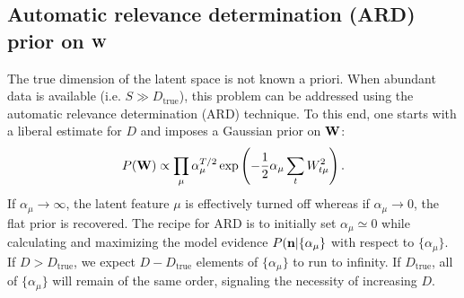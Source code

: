\documentclass[nofootinbib,amssymb,amsmath]{revtex4}
\newcommand{\vn}{{\bf n}}
\newcommand{\vW}{{\bf W}}
\begin{document}
\subsection{Automatic relevance determination (ARD) prior on $\vW$}
The true dimension of the latent space is not known a priori. When abundant data is available (i.e. $S \gg D_\mathrm{true}$), this problem can be addressed using the automatic relevance determination (ARD) technique. To this end, one starts with a liberal estimate for $D$ and imposes a Gaussian prior on $\vW$:
\begin{equation}
P(\vW) \propto \prod_\mu \alpha_\mu^{T/2} \exp \left( -\frac{1}{2} \alpha_\mu \sum_t W_{t\mu}^2  \right).
\label{eq:ARD_prior}
\end{equation}
If $\alpha_\mu \rightarrow \infty$, the latent feature $\mu$ is effectively turned off whereas if $\alpha_\mu \rightarrow 0$, the flat prior is recovered. The recipe for ARD is to initially set $\alpha_\mu \simeq 0$ while calculating and maximizing the model evidence $P(\vn | \{\alpha_\mu\}$ with respect to $\{\alpha_\mu\}$. If $D > D_\mathrm{true}$, we expect $D - D_\mathrm{true}$ elements of $\{\alpha_\mu\}$ to run to infinity. If $D_\mathrm{true}$, all of $\{\alpha_\mu\}$ will remain of the same order, signaling the necessity of increasing $D$.
\end{document}
